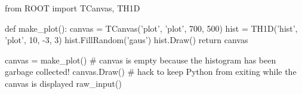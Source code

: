 \begin{footnotesize}
\begin{pyglist}[language=python,texcl=true,style=vs,bgcolor=Moccasin]
from ROOT import TCanvas, TH1D

def make_plot():
    canvas = TCanvas('plot', 'plot', 700, 500)
    hist = TH1D('hist', 'plot', 10, -3, 3)
    hist.FillRandom('gaus')
    hist.Draw()
    return canvas

canvas = make_plot()
# canvas is empty because the histogram has been garbage collected!
canvas.Draw()
# hack to keep Python from exiting while the canvas is displayed
raw_input()
\end{pyglist}
\end{footnotesize}
